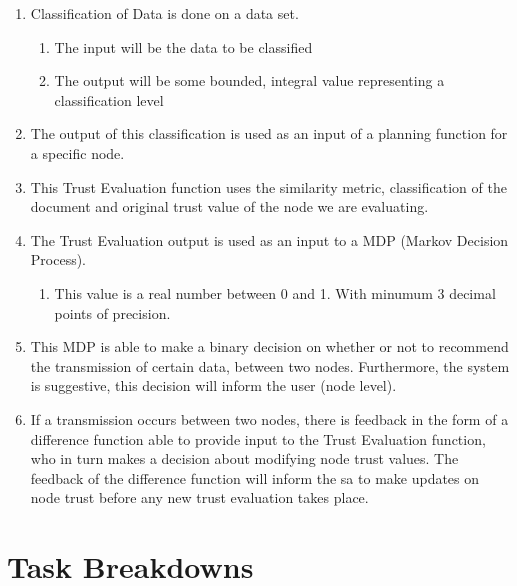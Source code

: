 \begin{enumerate}
    \item Classification of Data is done on a data set.
        \begin{enumerate}
            \item The input will be the data to be classified
            \item The output will be some bounded, integral value representing a classification level
        \end{enumerate}
    \item The output of this classification is used as an input of a planning function for a specific node.
    \item This Trust Evaluation function uses the similarity metric,
        classification of the document and original trust value of the node we
        are evaluating.
    \item The Trust Evaluation output is used as an input to a MDP (Markov Decision Process). 
        \begin{enumerate}
            \item This value is a real number between 0 and 1. With minumum 3 decimal points of precision.
        \end{enumerate}
    \item This MDP is able to make a binary decision on whether or not to
        recommend the transmission of certain data, between two nodes.
    Furthermore, the system is suggestive, this decision will inform the user
(node level).  
    \item If a transmission occurs between two nodes, there is feedback in the
        form of a difference function able to provide input to the Trust
    Evaluation function, who in turn makes a decision about modifying node trust values.
    The feedback of the difference function will inform the \gls{sa} to make updates on node
    trust before any new trust evaluation takes place.  
    
    \end{enumerate}

\FloatBarrier
\section{Task Breakdowns}


